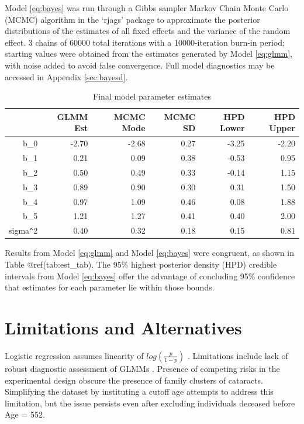 \documentclass[12pt]{article}
\begin{document}
Model \eqref{eq:bayes} was run through a Gibbs sampler Markov Chain Monte Carlo (MCMC) algorithm in the `rjags' package \citep{R-rjags} to approximate the posterior distributions of the estimates of all fixed effects and the variance of the random effect. 3 chains of 60000 total iterations with a 10000-iteration burn-in period; starting values were obtained from the estimates generated by Model \eqref{eq:glmm}, with noise added to avoid false convergence. Full model diagnostics may be accessed in Appendix \ref{sec:bayesd}.

\begin{table}[H]
\centering
\begin{tabular}{rrrrrr}
  \toprule
 & GLMM Est & MCMC Mode & MCMC SD & HPD Lower & HPD Upper \\ 
  \midrule
b\_0 & -2.70 & -2.68 & 0.27 & -3.25 & -2.20 \\ 
  b\_1 & 0.21 & 0.09 & 0.38 & -0.53 & 0.95 \\ 
  b\_2 & 0.50 & 0.49 & 0.33 & -0.14 & 1.15 \\ 
  b\_3 & 0.89 & 0.90 & 0.30 & 0.31 & 1.50 \\ 
  b\_4 & 0.97 & 1.09 & 0.46 & 0.08 & 1.88 \\ 
  b\_5 & 1.21 & 1.27 & 0.41 & 0.40 & 2.00 \\ 
  sigma\verb|^|2 & 0.40 & 0.32 & 0.18 & 0.15 & 0.81 \\ 
   \bottomrule
\end{tabular}
\caption{Final model parameter estimates} 
\label{tab:est_tab}
\end{table}

Results from Model \eqref{eq:glmm} and Model \eqref{eq:bayes} were congruent, as shown in Table @ref(tab:est\_tab). The 95\% highest posterior density (HPD) credible intervals from Model \eqref{eq:bayes} offer the advantage of concluding 95\% confidence that estimates for each parameter lie within those bounds.

\section{Limitations and Alternatives}
\label{sec:limits}

Logistic regression assumes linearity of \(log(\frac{p}{1-p})\) \citep{BMLR2021}.
Limitations include lack of robust diagnostic assessment of GLMMs \citep{CDA}.
Presence of competing risks in the experimental design obscure the presence of family clusters of cataracts. Simplifying the dataset by instituting a cutoff age attempts to address this limitation, but the issue persists even after excluding individuals deceased before Age = 552.
\end{document}
